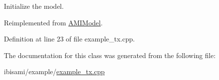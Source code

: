 Initialize the model. 



Reimplemented from \hyperlink{class_a_m_i_model_a8f45652e216686d0efa8db7e9dc0e915}{A\+M\+I\+Model}.



Definition at line 23 of file example\+\_\+tx.\+cpp.



The documentation for this class was generated from the following file\+:\begin{DoxyCompactItemize}
\item 
ibisami/example/\hyperlink{example__tx_8cpp}{example\+\_\+tx.\+cpp}\end{DoxyCompactItemize}
